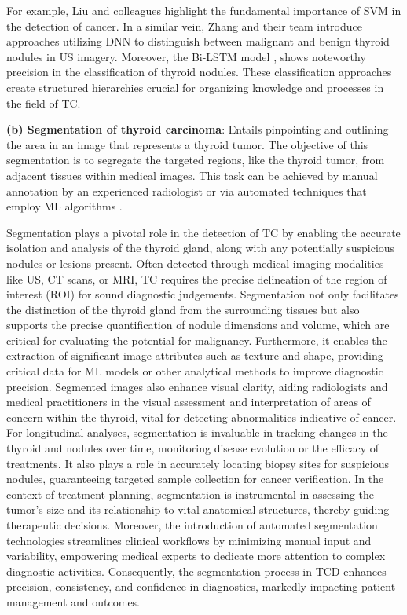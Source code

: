 \documentclass[a4paper,fleqn]{cas-sc}
\begin{document}
For example, Liu and colleagues \cite{liu2018setsvm} highlight the fundamental importance of \ac{SVM} in the detection of cancer. In a similar vein, Zhang and their team \cite{zhang2019integrating, zhang2019diagnosis} introduce approaches utilizing \ac{DNN} to distinguish between malignant and benign  thyroid nodules in \ac{US} imagery. Moreover, the \ac{Bi-LSTM} model \cite{chen2018thyroid}, shows noteworthy precision in the classification of thyroid nodules. These classification approaches create structured hierarchies crucial for organizing knowledge and processes in the field of TC.


\vskip2mm
\noindent \textbf{(b) Segmentation of thyroid carcinoma}: Entails pinpointing and outlining the area in an image that represents a thyroid tumor. The objective of this segmentation is to segregate the targeted regions, like the thyroid tumor, from adjacent tissues within medical images. This task can be achieved by manual annotation by an experienced radiologist or via automated techniques that employ \ac{ML} algorithms \cite{ma2023amseg, yadav2023assessment}.

Segmentation plays a pivotal role in the detection of TC by enabling the accurate isolation and analysis of the thyroid gland, along with any potentially suspicious nodules or lesions present. Often detected through medical imaging modalities like \ac{US}, \ac{CT} scans, or \ac{MRI}, TC requires the precise delineation of the region of interest (ROI) for sound diagnostic judgements. Segmentation not only facilitates the distinction of the thyroid gland from the surrounding tissues but also supports the precise quantification of nodule dimensions and volume, which are critical for evaluating the potential for malignancy. Furthermore, it enables the extraction of significant image attributes such as texture and shape, providing critical data for \ac{ML} models or other analytical methods to improve diagnostic precision. Segmented images also enhance visual clarity, aiding radiologists and medical practitioners in the visual assessment and interpretation of areas of concern within the thyroid, vital for detecting abnormalities indicative of cancer. For longitudinal analyses, segmentation is invaluable in tracking changes in the thyroid and nodules over time, monitoring disease evolution or the efficacy of treatments. It also plays a role in accurately locating biopsy sites for suspicious nodules, guaranteeing targeted sample collection for cancer verification. In the context of treatment planning, segmentation is instrumental in assessing the tumor's size and its relationship to vital anatomical structures, thereby guiding therapeutic decisions. Moreover, the introduction of automated segmentation technologies streamlines clinical workflows by minimizing manual input and variability, empowering medical experts to dedicate more attention to complex diagnostic activities. Consequently, the segmentation process in \ac{TCD} enhances precision, consistency, and confidence in diagnostics, markedly impacting patient management and outcomes.
\end{document}
